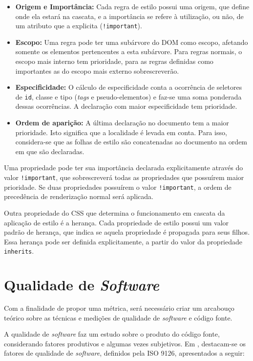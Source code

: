\begin{itemize}
	\item \textbf{Origem e Importância:} 
	Cada regra de estilo possui uma origem, que define onde ela estará na cascata, e a importância se refere à utilização, ou não, de um atributo que a explicita (\texttt{!important}).
	\item \textbf{Escopo:}
	Uma regra pode ter uma subárvore do DOM como escopo, afetando somente os elementos pertencentes a esta subárvore. Para regras normais, o escopo mais interno tem prioridade, para as regras definidas como importantes as do escopo mais externo sobrescreverão.
	\item \textbf{Especificidade:}
	O cálculo de especificidade conta a ocorrência de seletores de \texttt{id}, classe e tipo (\textit{tags} e pseudo-elementos) e faz-se uma soma ponderada dessas ocorrências. A declaração com maior especificidade tem prioridade.
	\item \textbf{Ordem de aparição:}
	A última declaração no documento tem a maior prioridade. Isto significa que a localidade é levada em conta. Para isso, considera-se que as folhas de estilo são concatenadas ao documento na ordem em que são declaradas.
\end{itemize}

Uma propriedade pode ter sua importância declarada explicitamente através do valor \texttt{!important}, que sobrescreverá todas as propriedades que possuírem maior prioridade. Se duas propriedades possuírem o valor \texttt{!important}, a ordem de precedência de renderização normal será aplicada.

Outra propriedade do CSS que determina o funcionamento em cascata da aplicação de estilo é a herança. Cada propriedade de estilo possui um valor padrão de herança, que indica se aquela propriedade é propagada para seus filhos. Essa herança pode ser definida explicitamente, a partir do valor da propriedade \texttt{inherits}. 

\section{Qualidade de \textit{Software}}

Com a finalidade de propor uma métrica, será necessário criar um arcabouço teórico sobre as técnicas e medições de qualidade de \textit{software} e código fonte.

A qualidade de \textit{software} faz um estudo sobre o produto do código fonte, considerando fatores produtivos e algumas vezes subjetivos. Em , destacam-se os fatores de qualidade de \textit{software}, definidos pela ISO 9126, apresentados a seguir:

